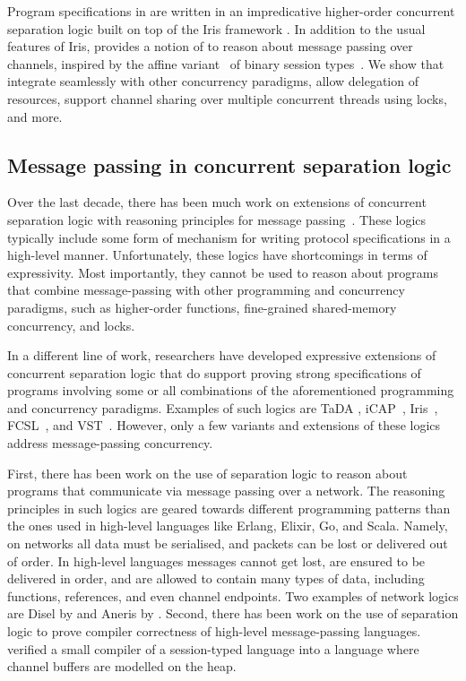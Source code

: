 Program specifications in \lname are written in an impredicative higher-order
concurrent separation logic built on top of the Iris framework
\cite{jung-POPL2015,krebbers-ESOP2017,jung-ICFP06,jung-JFP2018}.
In addition to the usual features of Iris, \lname
provides a notion of \emph{\pname} to reason about message passing over
channels, inspired by the affine variant~\cite{mostrous-COORDINATION2014} of
binary session types~\cite{honda-ESOP1998}.
We show that \pname integrate seamlessly with other concurrency
paradigms, allow delegation of resources,
support channel sharing over multiple concurrent threads using locks, and more.

\subsection{Message passing in concurrent separation logic}
\label{sec:intro_sep_logic}

Over the last decade, there has been much work on
extensions of concurrent separation logic with
reasoning principles for message passing~\cite{oortwijn-PLACES2016,francalanza-LMCS2011,villard-ICE2012,cracium-ICECCS2015}.
These logics typically include some form of mechanism for writing
protocol specifications in a
high-level manner.
Unfortunately, these logics have shortcomings in terms of expressivity.
Most importantly, they cannot be used to reason
about programs that combine message-passing with other programming and
concurrency paradigms, such as higher-order functions, fine-grained
shared-memory concurrency, and locks.

In a different line of work, researchers have developed expressive
extensions of concurrent separation logic that do support proving strong
specifications of programs involving some or all combinations of the
aforementioned programming and concurrency paradigms.
Examples of such logics are TaDA \cite{pinto-ECOOP2014}, iCAP~\cite{svendsen-ESOP2014},
Iris~\cite{jung-POPL2015}, FCSL~\cite{nanevski-ESOP2014}, and
VST~\cite{appel2014vst}.
However, only a few variants and extensions of these logics address
message-passing concurrency.

First, there has been work on the use of separation logic to reason about programs that communicate via message passing over a network.
The reasoning principles in such logics are geared towards different programming patterns than the ones used in high-level languages like Erlang, Elixir, Go, and Scala.
Namely, on networks all data must be serialised, and packets can be lost or delivered out of order.
In high-level languages messages cannot get lost, are ensured to be delivered in order, and are allowed to contain many types of data, including functions, references, and even channel endpoints.
Two examples of network logics are Disel by \citet{sergey-POPL2018} and
Aneris by \citet{krogh-jespersen}.
Second, there has been work on the use of separation logic to prove compiler correctness of high-level message-passing languages.
\citet{tassarotti-ESOP2017} verified a small compiler of a session-typed language into a language where channel buffers are modelled on the heap.

